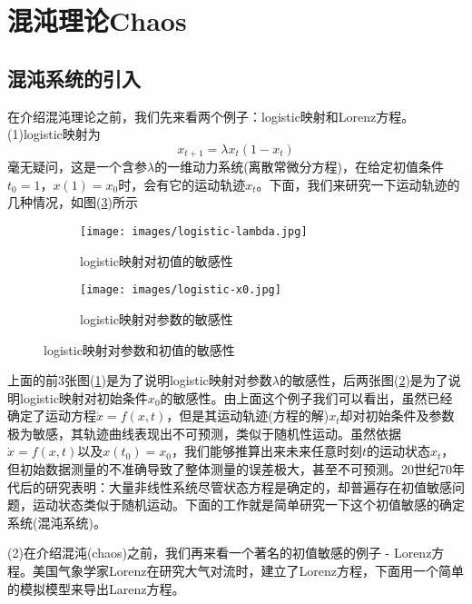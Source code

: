 \section{混沌理论Chaos}
    \subsection{混沌系统的引入}
        \par
        在介绍混沌理论之前，我们先来看两个例子：logistic映射和Lorenz方程。(1)logistic映射为
        \[
            x_{t+1}=\lambda x_t (1-x_t)
        \]
        毫无疑问，这是一个含参$\lambda$的一维动力系统(离散常微分方程)，在给定初值条件$t_0=1$，$x(1)=x_0$时，会有它的运动轨迹$x_t$。下面，我们来研究一下运动轨迹的几种情况，如图(\ref{logistic映射对参数和初值的敏感性})所示
	    \begin{figure}[H]
	        \centering
	        \begin{subfigure}[b]{0.4\textwidth}
	            \texttt{[image: images/logistic-lambda.jpg]}
	            \caption{logistic映射对初值的敏感性}
	            \label{logistic映射对初值的敏感性}
	        \end{subfigure}
	        \begin{subfigure}[b]{0.4\textwidth}
	            \texttt{[image: images/logistic-x0.jpg]}
	            \caption{logistic映射对参数的敏感性}
	            \label{logistic映射对参数的敏感性}
	        \end{subfigure}
	        \caption{logistic映射对参数和初值的敏感性}
	        \label{logistic映射对参数和初值的敏感性}
	    \end{figure}
        \par
        上面的前3张图(\ref{logistic映射对初值的敏感性})是为了说明logistic映射对参数$\lambda$的敏感性，后两张图(\ref{logistic映射对参数的敏感性})是为了说明logistic映射对初始条件$x_0$的敏感性。由上面这个例子我们可以看出，虽然已经确定了运动方程$\dot{x}=f(x,t)$，但是其运动轨迹(方程的解)$x_t$却对初始条件及参数极为敏感，其轨迹曲线表现出不可预测，类似于随机性运动。虽然依据$\dot{x}=f(x,t)$以及$x(t_0)=x_0$，我们能够推算出来未来任意时刻$t$的运动状态$x_t$，但初始数据测量的不准确导致了整体测量的误差极大，甚至不可预测。20世纪70年代后的研究表明：大量非线性系统尽管状态方程是确定的，却普遍存在初值敏感问题，运动状态类似于随机运动。下面的工作就是简单研究一下这个初值敏感的确定系统(混沌系统)。
        \par
        (2)在介绍混沌(chaos)之前，我们再来看一个著名的初值敏感的例子 - Lorenz方程。美国气象学家Lorenz在研究大气对流时，建立了Lorenz方程，下面用一个简单的模拟模型来导出Larenz方程。
